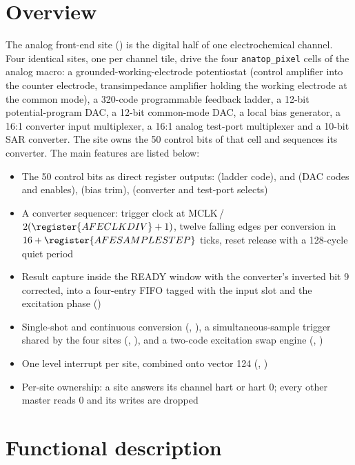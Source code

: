 \section{Overview}

The analog front-end site () is the digital half of one electrochemical channel. Four identical sites, one per channel tile, drive the four \texttt{anatop\_pixel} cells of the analog macro: a grounded-working-electrode potentiostat (control amplifier into the counter electrode, transimpedance amplifier holding the working electrode at the common mode), a 320-code programmable feedback ladder, a 12-bit potential-program DAC, a 12-bit common-mode DAC, a local bias generator, a 16:1 converter input multiplexer, a 16:1 analog test-port multiplexer and a 10-bit SAR converter. The site owns the 50 control bits of that cell and sequences its converter. The main features are listed below:

\begin{itemize}
	\item The 50 control bits as direct register outputs:  (ladder code),  and  (DAC codes and enables),  (bias trim),  (converter and test-port selects)
	\item A converter sequencer: trigger clock at MCLK\,/\,$2(\register{AFECLKDIV}+1)$, twelve falling edges per conversion in $16 + \register{AFESAMPLESTEP}$ ticks, reset release with a 128-cycle quiet period
	\item Result capture inside the READY window with the converter's inverted bit 9 corrected, into a four-entry FIFO tagged with the input slot and the excitation phase ()
	\item Single-shot and continuous conversion (, ), a simultaneous-sample trigger shared by the four sites (, ), and a two-code excitation swap engine (, )
	\item One level interrupt per site, combined onto vector 124 (, )
	\item Per-site ownership: a site answers its channel hart or hart 0; every other master reads 0 and its writes are dropped
\end{itemize}

\section{Functional description}

